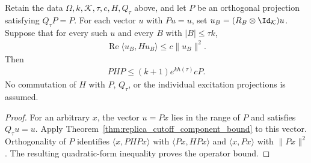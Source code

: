 \begin{theorem}
  \label{thm:replica_excitation_compression_bound}
  \leanok
  Retain the data $\Omega,k,\mathcal K,\tau,c,H,Q_\tau$ above, and let
  $P$ be an orthogonal projection satisfying $Q_\tau P=P$. For each
  vector $u$ with $Pu=u$, set $u_B=(R_B\otimes\Id_{\mathcal K})u$.
  Suppose that for every such $u$ and every $B$ with $|B|\le\tau k$,
  \begin{align}
    \operatorname{Re}\langle u_B,Hu_B\rangle\le c\|u_B\|^2.
  \end{align}
  Then
  \begin{align}
    PHP\le (k+1)e^{kh(\tau)}cP.
  \end{align}
  No commutation of $H$ with $P$, $Q_\tau$, or the individual excitation
  projections is assumed.
\end{theorem}
\begin{proof}
  \leanok
  For an arbitrary $x$, the vector $u=Px$ lies in the range of $P$ and
  satisfies $Q_\tau u=u$. Apply
  Theorem~\ref{thm:replica_cutoff_component_bound} to this vector.
  Orthogonality of $P$ identifies $\langle x,PHPx\rangle$ with
  $\langle Px,HPx\rangle$ and $\langle x,Px\rangle$ with $\|Px\|^2$.
  The resulting quadratic-form inequality proves the operator bound.
\end{proof}
